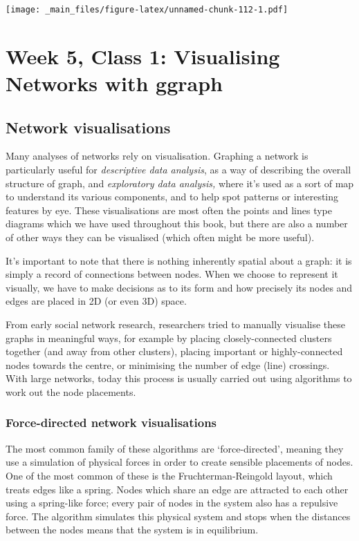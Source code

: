 \documentclass[
]{book}
\begin{document}
\texttt{[image: \_main\_files/figure-latex/unnamed-chunk-112-1.pdf]}

\hypertarget{week-5-class-1-visualising-networks-with-ggraph}{%
\chapter{Week 5, Class 1: Visualising Networks with ggraph}\label{week-5-class-1-visualising-networks-with-ggraph}}

\hypertarget{network-visualisations}{%
\section{Network visualisations}\label{network-visualisations}}

Many analyses of networks rely on visualisation. Graphing a network is particularly useful for \emph{descriptive data analysis}, as a way of describing the overall structure of graph, and \emph{exploratory data analysis,} where it's used as a sort of map to understand its various components, and to help spot patterns or interesting features by eye. These visualisations are most often the points and lines type diagrams which we have used throughout this book, but there are also a number of other ways they can be visualised (which often might be more useful).

It's important to note that there is nothing inherently spatial about a graph: it is simply a record of connections between nodes. When we choose to represent it visually, we have to make decisions as to its form and how precisely its nodes and edges are placed in 2D (or even 3D) space.

From early social network research, researchers tried to manually visualise these graphs in meaningful ways, for example by placing closely-connected clusters together (and away from other clusters), placing important or highly-connected nodes towards the centre, or minimising the number of edge (line) crossings. With large networks, today this process is usually carried out using algorithms to work out the node placements.

\hypertarget{force-directed-network-visualisations}{%
\subsection{Force-directed network visualisations}\label{force-directed-network-visualisations}}

The most common family of these algorithms are `force-directed', meaning they use a simulation of physical forces in order to create sensible placements of nodes. One of the most common of these is the Fruchterman-Reingold layout, which treats edges like a spring. Nodes which share an edge are attracted to each other using a spring-like force; every pair of nodes in the system also has a repulsive force. The algorithm simulates this physical system and stops when the distances between the nodes means that the system is in equilibrium.
\end{document}
